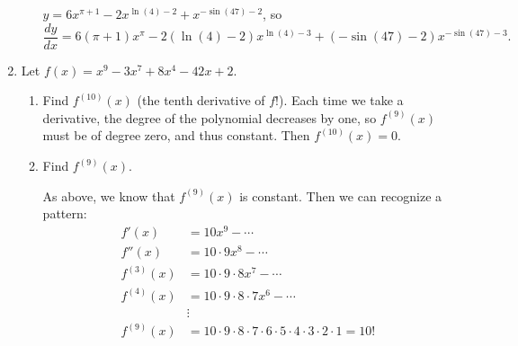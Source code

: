 \documentclass[11pt]{article}
\newcommand{\ds}{\displaystyle}
\begin{document}
\begin{enumerate}
\begin{enumerate}
{      $y=6x^{\pi+1}-2x^{\ln(4)-2}+x^{-\sin(47)-2}$, so
      \[
      \frac{dy}{dx} = 6(\pi+1) x^{\pi} - 2(\ln(4)-2) x^{\ln(4)-3} +
      (-\sin(47)-2) x^{-\sin(47) - 3}.
      \]

    }
    \vfill
  \end{enumerate}
  \newpage
  
\item Let $f(x)=x^9-3x^7+8x^4-42x+2$.
  \begin{enumerate}
  \item Find $\ds f^{(10)}(x)$ (the tenth derivative of $f$!).
    \vfill
    {\color{blue}
      Each time we take a derivative, the degree of the polynomial
      decreases by one, so $f^{(9)}(x)$ must be of degree zero, and
      thus constant.  Then $f^{(10)}(x) = 0$.
    }
    \vfill
  \item Find $\ds f^{(9)}(x)$.
    \vfill
    {\color{blue}
      
      As above, we know that $f^{(9)}(x)$ is constant.  Then we can
      recognize a pattern:
      \begin{align*}
        f'(x) &= 10x^9 - \cdots\\
        f''(x) &= 10\cdot 9x^8 - \cdots\\
        f^{(3)}(x) &= 10\cdot 9\cdot 8x^7 - \cdots\\
        f^{(4)}(x) &= 10\cdot 9\cdot 8\cdot 7x^6 - \cdots\\
        &\vdots\\
        f^{(9)}(x) &= 10\cdot 9\cdot 8\cdot 7\cdot 6\cdot 5\cdot 4\cdot 3\cdot 2\cdot 1 = 10!\\
      \end{align*}

    }
    \vfill
  \end{enumerate}


\end{enumerate}
\end{document}
